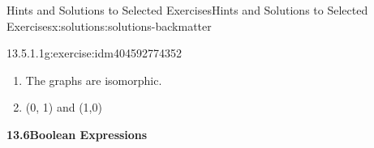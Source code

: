 \documentclass[twoside,10pt,]{book}
\newcommand{\blocktitlefont}{\relax}
\numberwithin{equation}{section}
\begin{document}
\begin{solutions-chapter}{Hints and Solutions to Selected Exercises}{}{Hints and Solutions to Selected Exercises}{}{}{x:solutions:solutions-backmatter}
\begin{divisionsolution}{13.5.1.1}{}{g:exercise:idm404592774352}
\begin{enumerate}[label=(\alph*)]
\begin{equation*}
\begin{array}{lc}
\begin{array}{c|cccc}
\lor & (0,0) & (0,1) & (1,0) & (1,1) \\
\hline
(0,0) & (0,0) & (0,1) & (1,0) & (1,1) \\
(0,1) &(0,1) & (0,1) & (1,1) & (1,1) \\
(1,0) & (1,0) & (1,1) & (1,0) & (1,1) \\
(1,1) & (1,1) & (1,1) & (1,1) & (1,1) \\
\end{array}
&\\
\begin{array}{c|cccc}
\land & (0,0) & (0,1) & (1,0) & (1,1) \\
\hline
(0,0) &(0,0) & (0,0) & (0,0) & (0,0) \\
(0,1) &(0,0) & (0,1) & (0,0) & (0,1) \\
(1,0) &(0,0) & (0,0) & (1,0) & (1,0) \\
(1,1) &(0,0) & (0,1) & (1,0) & (1,1) \\
\end{array}
&
\begin{array}{c|c}
u & \overset{\pmb{\_}}{u} \\
\hline
(0,0) & (1,1) \\
(0,1) &(1,0) \\
(1,0) &(0,1) \\
(1,1) &(0,0) \\
\end{array}
\\
\end{array}
\end{equation*}
%
\item{}The graphs are isomorphic.%
\item{}(0, 1) and (1,0)%
\end{enumerate}
%
\end{divisionsolution}%
%
\par\smallskip
\noindent\textbf{\Large{}13.6\space\textperiodcentered\space{}Boolean Expressions}

\end{solutions-chapter}
\end{document}
